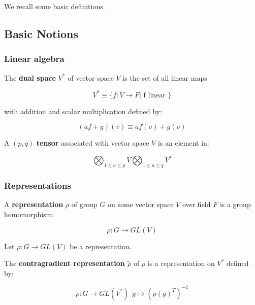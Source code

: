 We recall some basic definitions.


\subsection{Basic Notions}

    \subsubsection{Linear algebra}

        \begin{defn}

            The \textbf{dual space} $V^*$ of vector space $V$ is the set of all linear maps

            $$V^* \equiv \{ f: V \to F | \text{ f linear } \}$$


            with addition and scalar multiplication defined by:

            $$ (af + g) (v) \equiv a f(v) + g(v) $$

        \end{defn}

        \begin{defn}


            A $(p, q)$ \textbf{tensor} associated with vector space $V$ is an element in:

            $$\bigotimes_{1 \le a \le p} V \bigotimes_{1 \le a \le q} V^* $$

        \end{defn}


    \subsubsection{Representations}

        \begin{defn}

            A \textbf{representation} $\rho$ of group $G$ on some vector space $V$ over field $F$ is a group homomorphism:

            $$ \rho: G \to GL(V)$$

        \end{defn}

        Let $ \rho: G \to GL(V)$ be a representation.

        \begin{defn}

            The \textbf{contragradient representation $\tilde \rho$} of $\rho$ is a representation on $V^*$ defined by:

            $$ \tilde \rho: G \to GL(V^*) ~~ g \mapsto ( \rho(g)^T )^{-1} $$

        \end{defn}


